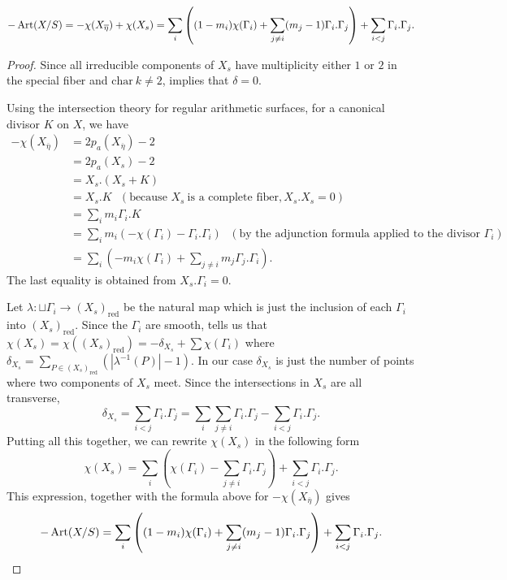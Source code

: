 \begin{lemma}
 \[ -\operatorname{Art}(X/S) = -\chi(X_{\overline{\eta}})+\chi(X_s) =  \sum_i \left( (1-m_i)\chi(\Gamma_i) + \sum_{j \neq i} (m_j-1) \Gamma_i.\Gamma_j \right) + \sum_{i < j} \Gamma_i.\Gamma_j .\] 
\end{lemma}
\begin{proof}
 Since all irreducible components of $X_s$ have multiplicity either $1$ or $2$ in the special fiber and $\mathrm{char}\ k \neq 2$, \cite[Theorem~3]{saito1} implies that $\delta = 0$. 

 Using the intersection theory for regular arithmetic surfaces, for a canonical divisor $K$ on $X$, we have
\begin{align*}
 -\chi(X_{\overline{\eta}}) &= 2p_a(X_{\overline{\eta}}) - 2 \\
 &= 2p_a(X_s)-2 \\
 &= X_s.(X_s+K) \\
 &= X_s.K \ \ \ (\textrm{because } X_s \ {\textrm{is a complete fiber}}, X_s.X_s = 0) \\
 &= \sum_i m_i \Gamma_i.K \\
 &= \sum_i m_i (-\chi(\Gamma_i) - \Gamma_i.\Gamma_i) \ \ \ (\textrm{by the adjunction formula applied to the divisor } \Gamma_i)\\
 &= \sum_i \left( -m_i \chi(\Gamma_i) + \sum_{j \neq i} m_j \Gamma_j.\Gamma_i \right) .
\end{align*}
The last equality is obtained from $X_s.\Gamma_i = 0$. 

Let $\lambda \colon \sqcup \Gamma_i \rightarrow (X_s)_{\mathrm{red}}$ be the natural map which is just the inclusion of each $\Gamma_i$ into $(X_s)_{\mathrm{red}}$. Since the $\Gamma_i$ are smooth, \cite[Theorem~2.6]{lor} tells us that $\chi(X_s) = \chi((X_s)_{\mathrm{red}}) = -\delta_{X_s} + \sum \chi(\Gamma_i)$ where $\delta_{X_s} = \sum_{P \in (X_s)_{\mathrm{red}}} ( |\lambda^{-1}(P)| - 1 )$. In our case $\delta_{X_s}$ is just the number of points where two components of $X_s$ meet. Since the intersections in $X_s$ are all transverse, 
\[ \delta_{X_s} = \sum_{i < j} \Gamma_i.\Gamma_j  = \sum_i \sum_{j \neq i} \Gamma_i.\Gamma_j - \sum_{i < j} \Gamma_i.\Gamma_j .\] 
Putting all this together, we can rewrite $\chi(X_s)$ in the following form
\[ \chi(X_s) = \sum_i \left( \chi(\Gamma_i) - \sum_{j \neq i} \Gamma_i.\Gamma_j \right) + \sum_{i < j} \Gamma_i.\Gamma_j .\]
This expression, together with the formula above for $-\chi(X_{\overline{\eta}})$ gives
\[ -\operatorname{Art} (X/S) = \sum_i \left( (1-m_i)\chi(\Gamma_i) + \sum_{j \neq i} (m_j-1) \Gamma_i.\Gamma_j \right) + \sum_{i < j} \Gamma_i.\Gamma_j . \qedhere \]
\end{proof}

